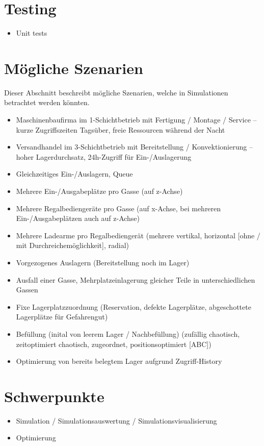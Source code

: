 \documentclass[11pt,a4paper]{article}
\begin{document}
\section{Testing}
\begin{itemize}
  \item Unit tests
\end{itemize}
%
\section{Mögliche Szenarien}\label{szenarien}
Dieser Abschnitt beschreibt mögliche Szenarien, welche in Simulationen betrachtet werden könnten.
%
\begin{itemize}
  \item Maschinenbaufirma im 1-Schichtbetrieb mit Fertigung / Montage / Service -- kurze Zugriffszeiten Tagsüber, freie Ressourcen während der Nacht
  \item Versandhandel im 3-Schichtbetrieb mit Bereitstellung / Konvektionierung --  hoher Lagerdurchsatz, 24h-Zugriff für Ein-/Auslagerung
  \item Gleichzeitiges Ein-/Auslagern, Queue
  \item Mehrere Ein-/Ausgabeplätze pro Gasse (auf z-Achse)
  \item Mehrere Regalbediengeräte pro Gasse (auf x-Achse, bei mehreren Ein-/Ausgabeplätzen auch auf z-Achse)
  \item Mehrere Ladearme pro Regalbediengerät (mehrere vertikal, horizontal [ohne / mit Durchreichemöglichkeit], radial)
  \item Vorgezogenes Auslagern (Bereitstellung noch im Lager)
  \item Ausfall einer Gasse, Mehrplatzeinlagerung gleicher Teile in unterschiedlichen Gassen
  \item Fixe Lagerplatzzuordnung (Reservation, defekte Lagerplätze, abgeschottete Lagerplätze für Gefahrengut)
  \item Befüllung (inital von leerem Lager / Nachbefüllung) (zufällig chaotisch, zeitoptimiert chaotisch, zugeordnet, positionsoptimiert [ABC])
  \item Optimierung von bereits belegtem Lager aufgrund Zugriff-History
\end{itemize}
%
\section{Schwerpunkte}
\begin{itemize}
  \item Simulation / Simulationsauswertung / Simulationsvisualisierung
  \item Optimierung
\end{itemize}
%
\end{document}
